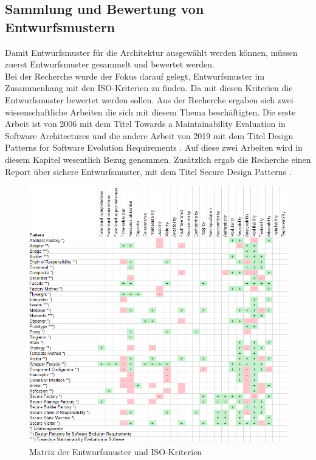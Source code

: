 \newpage
\subsection{Sammlung und Bewertung von Entwurfsmustern}
\label{Sammlung und Bewertung von Entwurfsmustern}
Damit Entwurfsmuster für die Architektur ausgewählt werden können, müssen zuerst Entwurfsmuster gesammelt und bewertet werden.\\

Bei der Recherche wurde der Fokus darauf gelegt, Entwurfsmuster im Zusammenhang mit den ISO-Kriterien zu finden. Da mit diesen Kriterien die Entwurfsmuster bewertet werden sollen. Aus der Recherche ergaben sich zwei wissenschaftliche Arbeiten die sich mit diesem Thema beschäftigten. Die erste Arbeit ist von 2006 mit dem Titel \glqq Towards a Maintainability Evaluation in Software Architectures \grqq \cite{towards_maintain} und die andere Arbeit von 2019 mit dem Titel \glqq Design Patterns for Software Evolution Requirements \grqq \cite{SW_evol_req}. Auf diese zwei Arbeiten wird in diesem Kapitel wesentlich Bezug genommen. Zusätzlich ergab die Recherche einen Report über sichere Entwurfsmuster, mit dem Titel \glqq Secure Design Patterns \grqq \cite{DoughertySecureDesign2009}.

\begin{figure}[htb]
	\centering
	\includegraphics[width=14.5cm]{img/3_entwicklung_neues_kontept/Pattern_Sammlung_neu}
	\caption{Matrix der Entwurfsmuster und ISO-Kriterien}
	\label{fig:pattern_sam}
\end{figure}

